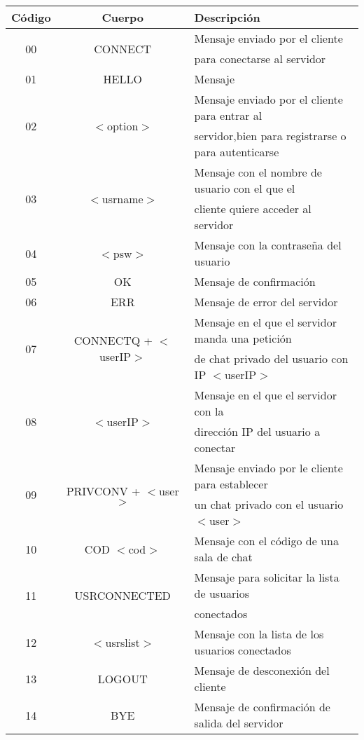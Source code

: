 \documentclass[12pt]{article}       %
\begin{document}
\begin{center}
\begin{tabular}{|c|c|l|}

\hline
Código & Cuerpo & Descripción \\
\hline
\hline
\multirow{2}{*}{00} & \multirow{2}{*}{CONNECT} &  Mensaje enviado por el cliente\\
					&						   &  para conectarse al servidor\\
\hline
01 & HELLO &  Mensaje \\
\hline
\multirow{2}{*}{02} & \multirow{2}{*}{$<$option$>$} &  Mensaje enviado por el cliente para entrar al\\
					&							&servidor,bien para registrarse o para autenticarse\\
\hline
\multirow{2}{*}{03} & \multirow{2}{*}{$<$usrname$>$} &  Mensaje con el nombre de usuario con el que el\\
					&								 &cliente quiere acceder al servidor\\
\hline
04 & $<$psw$>$ &  Mensaje con la contraseña del usuario\\
\hline
05 & OK &  Mensaje de confirmación\\
\hline
06 & ERR &  Mensaje de error del servidor\\
\hline
\multirow{2}{*}{07} & \multirow{2}{*}{CONNECTQ + $<$userIP$>$} &  Mensaje en el que el servidor manda una petición\\
				   &										  & de chat privado del usuario con IP $<$userIP$>$ \\
\hline
\multirow{2}{*}{08} & \multirow{2}{*}{$<$userIP$>$} &  Mensaje en el que el servidor con la\\
					&								&  dirección IP del usuario a conectar\\
\hline
\multirow{2}{*}{09} & \multirow{2}{*}{PRIVCONV + $<$user$>$} & Mensaje enviado por le cliente para establecer\\
					&										 & un chat privado con el usuario $<$user$>$\\
\hline
10 & COD $<$cod$>$ & Mensaje con el código de una sala de chat\\
\hline
\multirow{2}{*}{11} & \multirow{2}{*}{USRCONNECTED} & Mensaje para solicitar la lista de usuarios\\
					& 								& conectados\\
\hline
12 & $<$usrslist$>$ & Mensaje con la lista de los usuarios conectados\\
\hline
13 & LOGOUT & Mensaje de desconexión del cliente\\
\hline
14 & BYE & Mensaje de confirmación de salida del servidor \\
\hline
\end{tabular}
\end{center}
\end{document}
